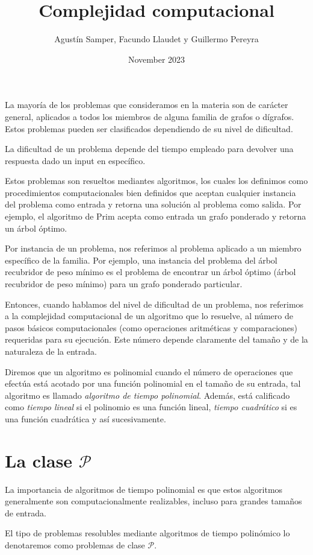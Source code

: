 \documentclass{article}
\title{Complejidad computacional}
\author{Agustín Samper, Facundo Llaudet y Guillermo Pereyra}
\date{November 2023}
\begin{document}
\maketitle
La mayoría de los problemas que consideramos en la materia son de 
carácter general, aplicados a todos los miembros de alguna familia de
grafos o dígrafos. Estos problemas pueden ser clasificados dependiendo de su nivel de dificultad.

La dificultad de un problema depende del tiempo empleado para
devolver una respuesta dado un input en específico.

Estos problemas son resueltos mediantes algoritmos, los cuales
los definimos como procedimientos computacionales bien definidos que 
aceptan cualquier instancia del problema como entrada y retorna una
solución al problema como salida. Por ejemplo,
el algoritmo de Prim acepta como entrada un grafo ponderado y retorna un
árbol óptimo.

Por instancia de un problema, nos referimos al
problema aplicado a un miembro específico de la familia. Por ejemplo,
una instancia del problema del árbol recubridor de peso mínimo es el
problema de encontrar un árbol óptimo (árbol recubridor de peso mínimo)
para un grafo ponderado particular.

Entonces, cuando hablamos del nivel de dificultad de un problema, nos
referimos a la complejidad computacional de un algoritmo que lo resuelve,
al número de pasos básicos computacionales (como operaciones aritméticas y comparaciones)
requeridas para su ejecución. Este número depende claramente del tamaño y de la 
naturaleza de la entrada.

Diremos que un algoritmo es polinomial cuando el número de
operaciones que efectúa está acotado por una función polinomial en
el tamaño de su entrada, tal algoritmo es llamado \textit{algoritmo
de tiempo polinomial}. Además, está calificado como \textit{tiempo lineal}
si el polinomio es una función lineal, \textit{tiempo cuadrático} si 
es una función cuadrática y así sucesivamente.

\section*{La clase $\mathcal{P}$}
La importancia de algoritmos de tiempo polinomial es que estos algoritmos
generalmente son computacionalmente realizables, incluso para grandes
tamaños de entrada.

El tipo de problemas resolubles mediante algoritmos de tiempo polinómico
lo denotaremos como problemas de clase $\mathcal{P}$.
\end{document}
